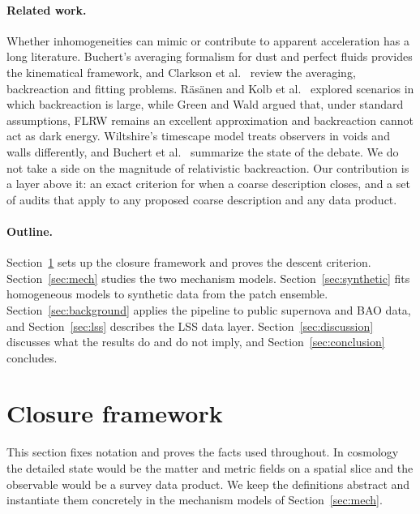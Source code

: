\documentclass[11pt]{article}
\theoremstyle{plain}
\theoremstyle{definition}
\theoremstyle{remark}
\begin{document}
\paragraph{Related work.}
Whether inhomogeneities can mimic or contribute to apparent acceleration has a long literature. Buchert's averaging formalism for dust and perfect fluids \cite{Buchert2000Dust,Buchert2001PerfectFluid} provides the kinematical framework, and Clarkson et al.\ \cite{Clarkson2011Averaging} review the averaging, backreaction and fitting problems. R\"as\"anen \cite{Rasanen2004Backreaction} and Kolb et al.\ \cite{Kolb2006Acceleration} explored scenarios in which backreaction is large, while Green and Wald \cite{GreenWald2014FLRW} argued that, under standard assumptions, FLRW remains an excellent approximation and backreaction cannot act as dark energy. Wiltshire's timescape model \cite{Wiltshire2007Cosmic} treats observers in voids and walls differently, and Buchert et al.\ \cite{Buchert2015Backreaction} summarize the state of the debate. We do not take a side on the magnitude of relativistic backreaction. Our contribution is a layer above it: an exact criterion for when a coarse description closes, and a set of audits that apply to any proposed coarse description and any data product.

\paragraph{Outline.}
Section~\ref{sec:framework} sets up the closure framework and proves the descent criterion. Section~\ref{sec:mech} studies the two mechanism models. Section~\ref{sec:synthetic} fits homogeneous models to synthetic data from the patch ensemble. Section~\ref{sec:background} applies the pipeline to public supernova and BAO data, and Section~\ref{sec:lss} describes the LSS data layer. Section~\ref{sec:discussion} discusses what the results do and do not imply, and Section~\ref{sec:conclusion} concludes.

\section{Closure framework}\label{sec:framework}

This section fixes notation and proves the facts used throughout. In cosmology the detailed state would be the matter and metric fields on a spatial slice and the observable would be a survey data product. We keep the definitions abstract and instantiate them concretely in the mechanism models of Section~\ref{sec:mech}.
\end{document}
